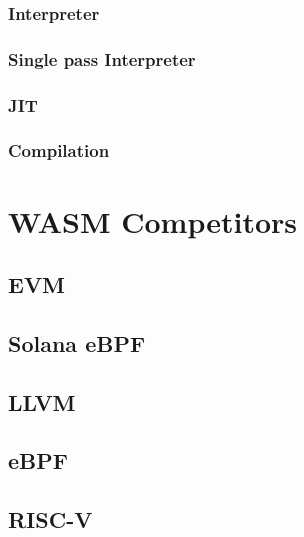 \documentclass{article}
\begin{document}
\subsubsection{Interpreter}
\subsubsection{Single pass Interpreter}
\subsubsection{JIT}
\subsubsection{Compilation}

\section{WASM Competitors}
\subsection{EVM}
\subsection{Solana eBPF}
\subsection{LLVM}
\subsection{eBPF}
\subsection{RISC-V}
\end{document}
